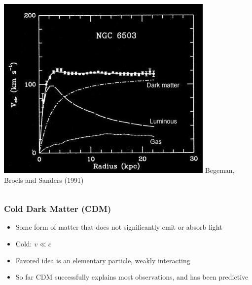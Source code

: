 \documentclass{beamer}
\begin{document}
{\begin{columns}
\begin{column}{0.5\textwidth}
\begin{center}
                \includegraphics[width=0.8\textwidth]{ngc-6503-rotation-curve.jpg}
                \newline
                {\tiny Begeman, Broels and Sanders (1991)}
            \end{center}
        \end{column}
    \end{columns}
}

\frame
{
    \frametitle{Cold Dark Matter (CDM)}


    \begin{itemize}

        \item Some form of matter that does not significantly emit or absorb light

        \item Cold:  $v \ll c$

        \item Favored idea is an elementary particle, weakly interacting

        \item So far CDM successfully explains most observations, and has been
            predictive

    \end{itemize}


}
\end{document}
